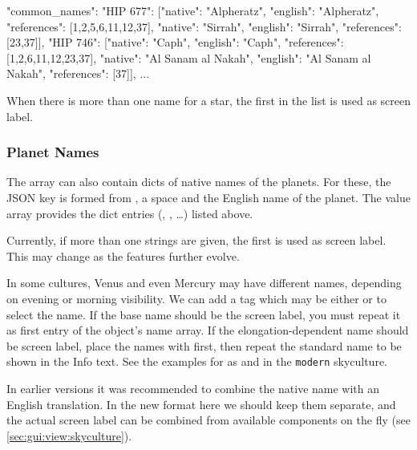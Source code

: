 \begin{jsonfile}[\tiny]
"common_names": {
    "HIP 677": [{"native": "Alpheratz",         "english": "Alpheratz",         "references": [1,2,5,6,11,12,37]},
                {"native": "Sirrah",            "english": "Sirrah",            "references": [23,37]}],
    "HIP 746": [{"native": "Caph",              "english": "Caph",              "references": [1,2,6,11,12,23,37]},
                {"native": "Al Sanam al Nakah", "english": "Al Sanam al Nakah", "references": [37]}],
	... }
\end{jsonfile}

When there is more than one name for a star, the first in the list is used as screen label. 


\subsubsection{Planet Names}
\label{sec:skycultures:planetnames}

The   array can also contain dicts of native names of the planets. 
For these, the JSON key is formed from , a space and the English name of the planet. 
The value array provides the dict entries (, , \ldots) listed above. 

Currently, if more than one  strings are given, the first is used as screen label. This may change as the features further evolve.

In some cultures, Venus and even Mercury may have different names, depending on evening or morning visibility. 
We can add a tag  which may be either  or  to select the name. 
If the base name should be the screen label, you must repeat it as first entry of the object's  name array. 
If the elongation-dependent name should be screen label, place the names with  first, then repeat the 
standard name to be shown in the Info text. 
See the examples for  as  and  in the \texttt{modern} skyculture.

In earlier versions it was recommended to combine the native name with an English translation. 
In the new format here we should keep them separate, and the actual screen label can be combined from available 
components on the fly (see \ref{sec:gui:view:skyculture}).



